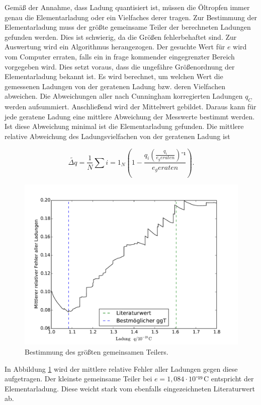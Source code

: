 Gemäß der Annahme, dass Ladung quantisiert ist, müssen die Öltropfen immer genau die Elementarladung oder ein Vielfaches derer tragen. Zur Bestimmung der Elementarladung muss der größte gemeinsame Teiler der berechneten Ladungen gefunden werden. Dies ist schwierig, da die Größen fehlerbehaftet sind. Zur Auswertung wird ein Algorithmus herangezogen.
Der gesuchte Wert für $e$ wird vom Computer erraten, falls ein in frage kommender eingegrenzter Bereich vorgegeben wird. Dies setzt voraus, dass die ungefähre Größenordnung der Elementarladung bekannt ist. Es wird berechnet, um welchen Wert die gemessenen Ladungen von der geratenen Ladung bzw. deren Vielfachen abweichen. Die Abweichungen aller nach Cunningham korregierten Ladungen $q_C$ werden aufsummiert. Anschließend wird der Mittelwert gebildet. Daraus kann für jede geratene Ladung eine mittlere Abweichung der Messwerte bestimmt werden. Ist diese Abweichung minimal ist die Elementarladung gefunden. Die mittlere relative Abweichung des Ladungsvielfachen von der geratenen Ladung ist

\begin{equation}
\tilde{\Delta{q}}=\frac{1}{N}\sum i=1_N \left(1-\frac{q_i\left(\frac{q_i}{e_geraten}\right)⁻¹}{e_geraten}\right).
\end{equation}
\begin{figure}
	\centering
	\includegraphics[width=\textwidth]{Bilder/plot_ggT}
	\caption{Bestimmung des größten gemeinsamen Teilers.}
	\label{fig:2}
\end{figure}
In Abbildung \ref{fig:2} wird der mittlere relative Fehler aller Ladungen gegen diese aufgetragen. Der kleinste gemeinsame Teiler bei $e=1,084\cdot10⁻¹⁹\,\si\coulomb$ entspricht der Elementarladung. Diese weicht stark vom ebenfalls eingezeichneten Literaturwert ab. 

